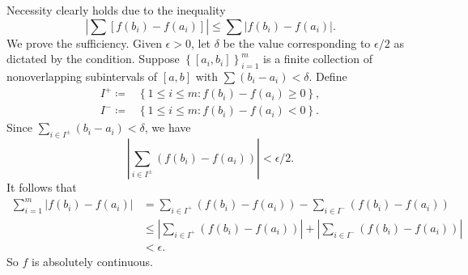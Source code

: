 \begin{exercise}{7.7}
  Necessity clearly holds due to the inequality
  \[
    \left| \sum \left[ f(b_i) - f(a_i) \right] \right|
    \le \sum \left| f(b_i) - f(a_i) \right|.
  \]
  We prove the sufficiency.
  Given $\epsilon > 0$,
  let $\delta$ be the value corresponding to $\epsilon/2$
  as dictated by the condition.
  Suppose $\left\{ [a_i, b_i] \right\}_{i=1}^m$ is a finite collection of
  nonoverlapping subintervals of $[a, b]$
  with $\sum \left( b_i - a_i \right) < \delta$.
  Define
  \[
    \begin{aligned}
      I^+ \coloneqq &\left\{ 1 \le i \le m : f(b_i) - f(a_i) \ge 0 \right\}, \\
      I^- \coloneqq &\left\{ 1 \le i \le m : f(b_i) - f(a_i) < 0 \right\}.
    \end{aligned}
  \]
  Since $\sum_{i \in I^{\pm}} \left( b_i - a_i \right) < \delta$,
  we have
  \[
    \left| \sum_{i \in I^\pm} \left( f(b_i) - f(a_i) \right) \right|
    < \epsilon/2.
  \]
  It follows that
  \[
    \begin{aligned}
      \sum_{i=1}^m \left| f(b_i) - f(a_i) \right|
      &=\sum_{i \in I^+} \left( f(b_i) - f(a_i) \right)
      - \sum_{i \in I^-} \left( f(b_i) - f(a_i) \right) \\
      &\le \left| \sum_{i \in I^+} \left( f(b_i) - f(a_i) \right) \right|
      + \left| \sum_{i \in I^-} \left( f(b_i) - f(a_i) \right) \right| \\
      &< \epsilon.
    \end{aligned}
  \]
  So $f$ is absolutely continuous.
\end{exercise}
